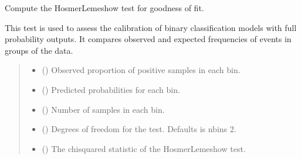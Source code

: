 \documentclass[letterpaper,10pt,english]{sphinxmanual}
\begin{document}
\begin{fulllineitems}
\label{\detokenize{calzone:calzone.metrics.hosmer_lemeshow_test}}
\pysigstartsignatures
{}
\pysigstopsignatures
\sphinxAtStartPar
Compute the Hosmer\sphinxhyphen{}Lemeshow test for goodness of fit.

\sphinxAtStartPar
This test is used to assess the calibration of binary classification models with full probability outputs.
It compares observed and expected frequencies of events in groups of the data.
\begin{quote}\begin{description}
\begin{itemize}
\item {} 
\sphinxAtStartPar
{} () \textendash{} Observed proportion of positive samples in each bin.

\item {} 
\sphinxAtStartPar
{} () \textendash{} Predicted probabilities for each bin.

\item {} 
\sphinxAtStartPar
{} () \textendash{} Number of samples in each bin.

\item {} 
\sphinxAtStartPar
{} (\sphinxstyleliteralemphasis{\sphinxupquote{, }}) \textendash{} Degrees of freedom for the test. Defaults is nbins \sphinxhyphen{} 2.

\end{itemize}

\begin{itemize}
\item {} 
\sphinxAtStartPar
{} () \textendash{} The chi\sphinxhyphen{}squared statistic of the Hosmer\sphinxhyphen{}Lemeshow test.


\end{itemize}
\end{description}
\end{quote}
\end{fulllineitems}
\end{document}
